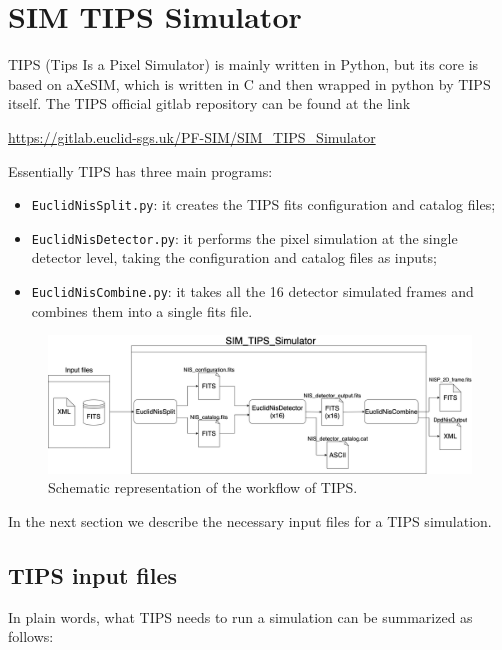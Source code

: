 \section{SIM TIPS Simulator}

TIPS (Tips Is a Pixel Simulator) is mainly written in Python, but its core is based on aXeSIM, which is written in C and then wrapped in python by TIPS itself. The TIPS official gitlab repository can be found at the link

\begin{center}
\url{https://gitlab.euclid-sgs.uk/PF-SIM/SIM_TIPS_Simulator}    
\end{center}

Essentially TIPS has three main programs:

\begin{itemize}
\item \verb+EuclidNisSplit.py+: it creates the TIPS fits configuration and catalog files;
\item \verb+EuclidNisDetector.py+: it performs the pixel simulation at the single detector level, taking the configuration and catalog files as inputs;
\item \verb+EuclidNisCombine.py+: it takes all the 16 detector simulated frames and combines them into a single fits file.
\end{itemize}

\begin{figure}
    \centering
    \includegraphics[scale=0.25]{figures/TIPS_workflow.png}
    \caption{Schematic representation of the workflow of TIPS.}
    \label{fig:TIPS_workflow}
\end{figure}

In the next section we describe the necessary input files for a TIPS simulation.

\subsection{TIPS input files}
In plain words, what TIPS needs to run a simulation can be summarized as follows:

